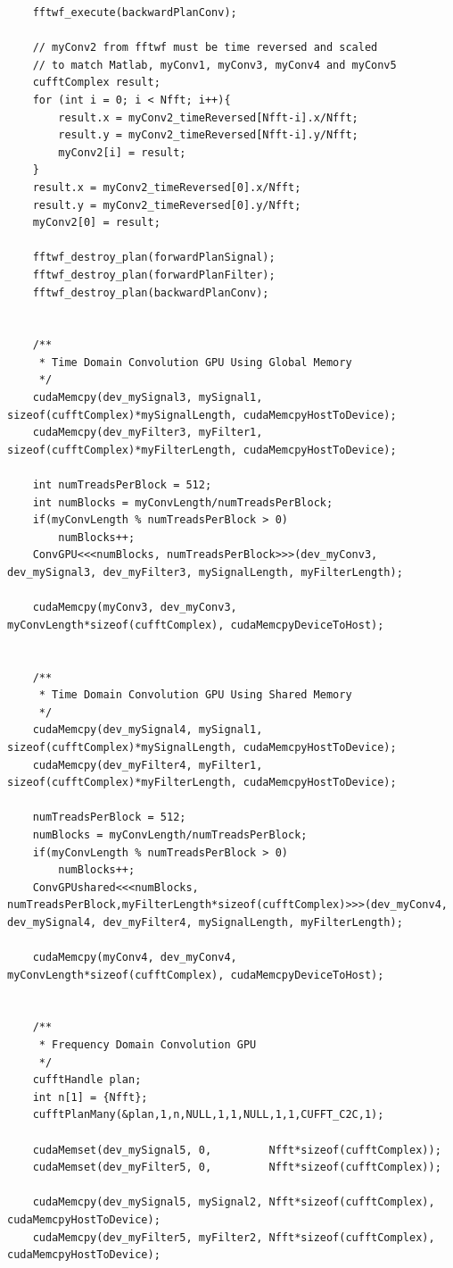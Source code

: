 \begin{lstlisting}
	fftwf_execute(backwardPlanConv);

	// myConv2 from fftwf must be time reversed and scaled
	// to match Matlab, myConv1, myConv3, myConv4 and myConv5
	cufftComplex result;
	for (int i = 0; i < Nfft; i++){
		result.x = myConv2_timeReversed[Nfft-i].x/Nfft;
		result.y = myConv2_timeReversed[Nfft-i].y/Nfft;
		myConv2[i] = result;
	}
	result.x = myConv2_timeReversed[0].x/Nfft;
	result.y = myConv2_timeReversed[0].y/Nfft;
	myConv2[0] = result;

	fftwf_destroy_plan(forwardPlanSignal);
	fftwf_destroy_plan(forwardPlanFilter);
	fftwf_destroy_plan(backwardPlanConv);


	/**
	 * Time Domain Convolution GPU Using Global Memory
	 */
	cudaMemcpy(dev_mySignal3, mySignal1, sizeof(cufftComplex)*mySignalLength, cudaMemcpyHostToDevice);
	cudaMemcpy(dev_myFilter3, myFilter1, sizeof(cufftComplex)*myFilterLength, cudaMemcpyHostToDevice);

	int numTreadsPerBlock = 512;
	int numBlocks = myConvLength/numTreadsPerBlock;
	if(myConvLength % numTreadsPerBlock > 0)
		numBlocks++;
	ConvGPU<<<numBlocks, numTreadsPerBlock>>>(dev_myConv3, dev_mySignal3, dev_myFilter3, mySignalLength, myFilterLength);

	cudaMemcpy(myConv3, dev_myConv3, myConvLength*sizeof(cufftComplex), cudaMemcpyDeviceToHost);


	/**
	 * Time Domain Convolution GPU Using Shared Memory
	 */
	cudaMemcpy(dev_mySignal4, mySignal1, sizeof(cufftComplex)*mySignalLength, cudaMemcpyHostToDevice);
	cudaMemcpy(dev_myFilter4, myFilter1, sizeof(cufftComplex)*myFilterLength, cudaMemcpyHostToDevice);

	numTreadsPerBlock = 512;
	numBlocks = myConvLength/numTreadsPerBlock;
	if(myConvLength % numTreadsPerBlock > 0)
		numBlocks++;
	ConvGPUshared<<<numBlocks, numTreadsPerBlock,myFilterLength*sizeof(cufftComplex)>>>(dev_myConv4, dev_mySignal4, dev_myFilter4, mySignalLength, myFilterLength);

	cudaMemcpy(myConv4, dev_myConv4, myConvLength*sizeof(cufftComplex), cudaMemcpyDeviceToHost);


	/**
	 * Frequency Domain Convolution GPU
	 */
	cufftHandle plan;
	int n[1] = {Nfft};
	cufftPlanMany(&plan,1,n,NULL,1,1,NULL,1,1,CUFFT_C2C,1);

	cudaMemset(dev_mySignal5, 0, 	     Nfft*sizeof(cufftComplex));
	cudaMemset(dev_myFilter5, 0, 	     Nfft*sizeof(cufftComplex));

	cudaMemcpy(dev_mySignal5, mySignal2, Nfft*sizeof(cufftComplex), cudaMemcpyHostToDevice);
	cudaMemcpy(dev_myFilter5, myFilter2, Nfft*sizeof(cufftComplex), cudaMemcpyHostToDevice);


\end{lstlisting}
